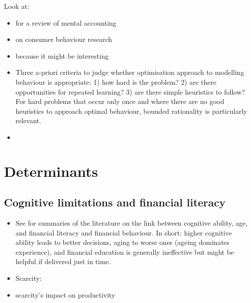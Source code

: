 \documentclass[a4paper, 11pt]{report}
\begin{document}
Look at:
\begin{itemize}
	\item \citet{thaler1999mental} for a review of mental accounting
	\item \citet{deaton1992understanding} on consumer behaviour research
	\item \citet{campbell1999force} because it might be interesting
\end{itemize}

\citet{thaler1994psychology}
\begin{itemize}
	\item Three a-priori criteria to judge whether optimisation approach to modelling behaviour is appropriate: 1) how hard is the problem? 2) are there opportunities for repeated learning? 3) are there simple heuristics to follow? For hard problems that occur only once and where there are no good heuristics to approach optimal behaviour, bounded rationality is particularly relevant.
	\item
\end{itemize}



							\chapter{Determinants}

\section{Cognitive limitations and financial literacy}
\begin{itemize}
	\item See \citet{agarwal2017shapes,greenberg2019financial} for summaries of the literature on the link between cognitive ability, age, and financial literacy and financial behaviour. In short: higher cognitive ability leads to better decisions, aging to worse ones (ageing dominates experience), and financial education is generally ineffective but might be helpful if delivered just in time.

	\item Scarcity: \citet{shah2012some,mani2013poverty,mullainathan2013scarcity,haushofer2014psychology,carvalho2016poverty}
	\item scarcity's impact on productivity \citet{kaur2021financial}
\end{itemize}
\end{document}
